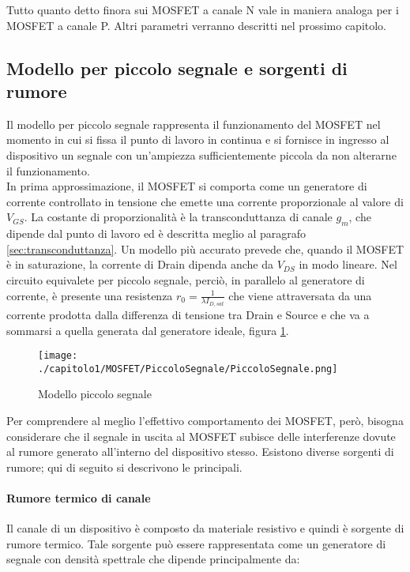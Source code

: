 Tutto quanto detto finora sui MOSFET a canale N vale in maniera analoga per i MOSFET a canale P.
Altri parametri verranno descritti nel prossimo capitolo.

\subsection{Modello per piccolo segnale e sorgenti di rumore}
Il modello per piccolo segnale rappresenta il funzionamento del MOSFET nel momento in cui si fissa il punto di lavoro in continua e si fornisce in ingresso al dispositivo un segnale con un'ampiezza sufficientemente piccola da non alterarne il funzionamento. \\

In prima approssimazione, il MOSFET si comporta come un generatore di corrente controllato in tensione che emette una corrente proporzionale al valore di $V_{GS}$. La costante di proporzionalità è la transconduttanza di canale $g_m$, che dipende dal punto di lavoro ed è descritta meglio al paragrafo \ref{sec:transconduttanza}. Un modello più accurato prevede che, quando il MOSFET è in saturazione, la corrente di Drain dipenda anche da $V_{DS}$ in modo lineare. Nel circuito equivalete per piccolo segnale, perciò, in parallelo al generatore di corrente, è presente una resistenza $r_0 = \frac{1}{\lambda I_{D,sat}}$ che viene attraversata da una corrente prodotta dalla differenza di tensione tra Drain e Source e che va a sommarsi a quella generata dal generatore ideale, figura \ref{fig:piccolo_segnale}.

\begin{figure}[t]
  
  \centering
  \texttt{[image: ./capitolo1/MOSFET/PiccoloSegnale/PiccoloSegnale.png]}
  \caption[Modello piccolo segnale]{Modello piccolo segnale}
  \label{fig:piccolo_segnale}

\end{figure}

\vspace*{0.5cm}

Per comprendere al meglio l'effettivo comportamento dei MOSFET, però, bisogna considerare che il segnale in uscita al MOSFET subisce delle interferenze dovute al rumore generato all'interno del dispositivo stesso. Esistono diverse sorgenti di rumore; qui di seguito si descrivono le principali.

\paragraph*{Rumore termico di canale}
Il canale di un dispositivo è composto da materiale resistivo e quindi è sorgente di rumore termico. Tale sorgente può essere rappresentata come un generatore di segnale con densità spettrale che dipende principalmente da:

